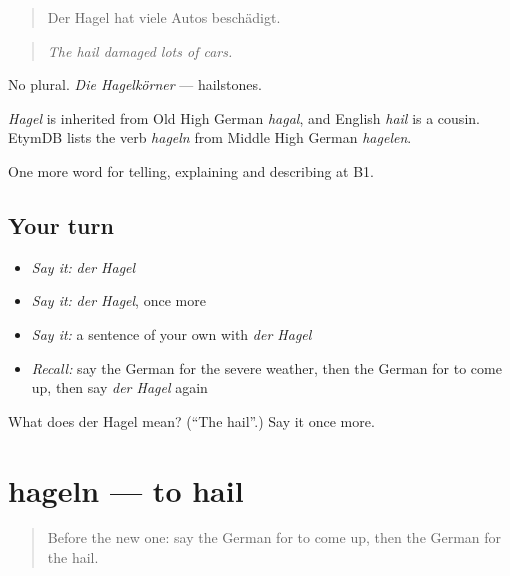\begin{quote}
Der Hagel hat viele Autos beschädigt.
\end{quote}

\begin{quote}
\emph{The hail damaged lots of cars.}
\end{quote}

No plural. \emph{Die Hagelkörner} — hailstones.

\begin{cousinweb}
\emph{Hagel} is inherited from Old High German \emph{hagal}, and English \emph{hail} is a cousin. EtymDB lists the verb \emph{hageln} from Middle High German \emph{hagelen}.
\end{cousinweb}

\begin{grammarlens}[title={What you've built}]
One more word for telling, explaining and describing at B1.
\end{grammarlens}

\subsection*{Your turn}
\begin{itemize}
\raggedright
  \item \emph{Say it:} \emph{der Hagel}
  \item \emph{Say it:} \emph{der Hagel}, once more
  \item \emph{Say it:} a sentence of your own with \emph{der Hagel}
  \item \emph{Recall:} say the German for the severe weather, then the German for to come up, then say \emph{der Hagel} again
\end{itemize}

\begin{tcolorbox}[breakable,colback=teal!4,colframe=teal!35!black,title={Before you move on}]
What does der Hagel mean? (\textquotedblleft{}The hail\textquotedblright{}.) Say it once more.
\end{tcolorbox}
\section[hageln]{hageln — to hail}

\label{lesson:GE-C462-hageln}



\begin{quote}
Before the new one: say the German for to come up, then the German for the hail.
\end{quote}

